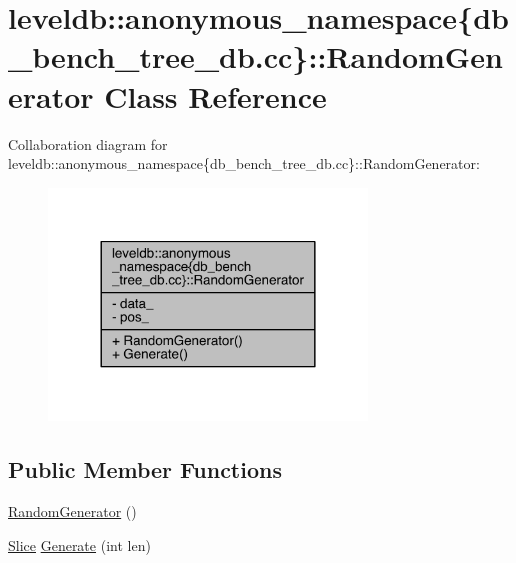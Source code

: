 \hypertarget{classleveldb_1_1anonymous__namespace_02db__bench__tree__db_8cc_03_1_1_random_generator}{}\section{leveldb\+:\+:anonymous\+\_\+namespace\{db\+\_\+bench\+\_\+tree\+\_\+db.\+cc\}\+:\+:Random\+Generator Class Reference}
\label{classleveldb_1_1anonymous__namespace_02db__bench__tree__db_8cc_03_1_1_random_generator}


Collaboration diagram for leveldb\+:\+:anonymous\+\_\+namespace\{db\+\_\+bench\+\_\+tree\+\_\+db.\+cc\}\+:\+:Random\+Generator\+:
\nopagebreak
\begin{figure}[H]
\begin{center}
\leavevmode
\includegraphics[width=240pt]{classleveldb_1_1anonymous__namespace_02db__bench__tree__db_8cc_03_1_1_random_generator__coll__graph}
\end{center}
\end{figure}
\subsection*{Public Member Functions}
\begin{DoxyCompactItemize}
\item 
\hyperlink{classleveldb_1_1anonymous__namespace_02db__bench__tree__db_8cc_03_1_1_random_generator_a4a0b9679ff4976ce231c236125316e09}{Random\+Generator} ()
\item 
\hyperlink{classleveldb_1_1_slice}{Slice} \hyperlink{classleveldb_1_1anonymous__namespace_02db__bench__tree__db_8cc_03_1_1_random_generator_a2354d483f1d5579d5aaeae37d57adde4}{Generate} (int len)
\end{DoxyCompactItemize}
